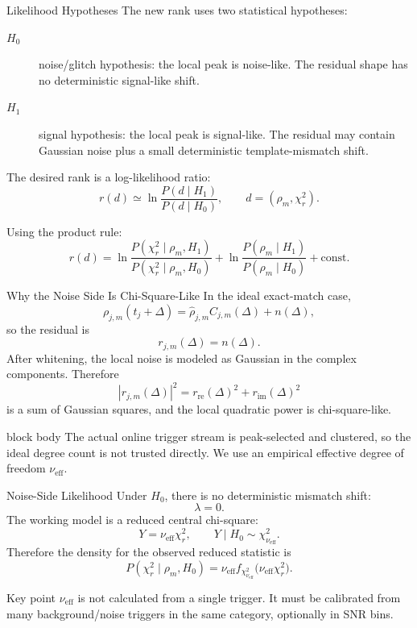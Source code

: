 \documentclass[aspectratio=169,10pt]{beamer}
\newcommand{\important}[1]{\begin{block}{Key point}\small #1\end{block}}
\newcommand{\proposal}[1]{\begin{beamercolorbox}[rounded=true,wd=\textwidth,sep=0.8em]{block body}\small #1\end{beamercolorbox}}
\begin{document}
\begin{frame}{Likelihood Hypotheses}
\small
The new rank uses two statistical hypotheses:
\begin{description}
  \item[\(H_0\)] noise/glitch hypothesis: the local peak is noise-like.  The residual shape has no deterministic signal-like shift.
  \item[\(H_1\)] signal hypothesis: the local peak is signal-like.  The residual may contain Gaussian noise plus a small deterministic template-mismatch shift.
\end{description}

The desired rank is a log-likelihood ratio:
\[
r(d)\simeq
\ln\frac{P(d\mid H_1)}{P(d\mid H_0)},
\qquad d=(\rho_m,\chi_r^2).
\]

Using the product rule:
\[
r(d)=
\ln\frac{P(\chi_r^2\mid\rho_m,H_1)}
        {P(\chi_r^2\mid\rho_m,H_0)}
+
\ln\frac{P(\rho_m\mid H_1)}{P(\rho_m\mid H_0)}
+\mathrm{const}.
\]
\end{frame}

\begin{frame}{Why the Noise Side Is Chi-Square-Like}
\small
In the ideal exact-match case,
\[
\rho_{j,m}(t_j+\Delta)=\hat\rho_{j,m}C_{j,m}(\Delta)+n(\Delta),
\]
so the residual is
\[
r_{j,m}(\Delta)=n(\Delta).
\]
After whitening, the local noise is modeled as Gaussian in the complex components.  Therefore
\[
|r_{j,m}(\Delta)|^2
=r_{\mathrm{re}}(\Delta)^2+r_{\mathrm{im}}(\Delta)^2
\]
is a sum of Gaussian squares, and the local quadratic power is chi-square-like.

\proposal{
The actual online trigger stream is peak-selected and clustered, so the ideal degree count is not trusted directly.  We use an empirical effective degree of freedom \(\nu_{\mathrm{eff}}\).
}
\end{frame}

\begin{frame}{Noise-Side Likelihood}
\small
Under \(H_0\), there is no deterministic mismatch shift:
\[
\lambda=0.
\]
The working model is a reduced central chi-square:
\[
Y=\nu_{\mathrm{eff}}\chi_r^2,
\qquad
Y\mid H_0\sim \chi^2_{\nu_{\mathrm{eff}}}.
\]
Therefore the density for the observed reduced statistic is
\[
P(\chi_r^2\mid\rho_m,H_0)
=
\nu_{\mathrm{eff}}
f_{\chi^2_{\nu_{\mathrm{eff}}}}
\bigl(\nu_{\mathrm{eff}}\chi_r^2\bigr).
\]

\important{
\(\nu_{\mathrm{eff}}\) is not calculated from a single trigger.  It must be calibrated from many background/noise triggers in the same category, optionally in SNR bins.
}
\end{frame}
\end{document}
